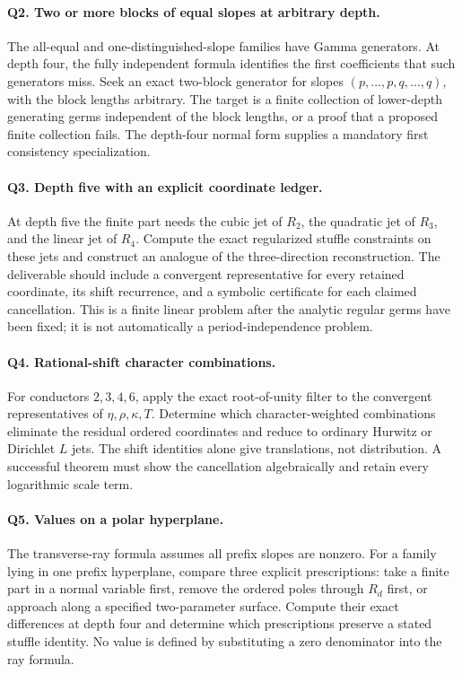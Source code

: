 \documentclass[11pt,a4paper]{article}
\numberwithin{equation}{section}
\theoremstyle{definition}
\theoremstyle{remark}
\begin{document}
\paragraph{Q2. Two or more blocks of equal slopes at arbitrary depth.}
The all-equal and one-distinguished-slope families have Gamma
generators. At depth four, the fully independent formula identifies
the first coefficients that such generators miss. Seek an exact
two-block generator for slopes
$(p,\ldots,p,q,\ldots,q)$, with the block lengths arbitrary. The target
is a finite collection of lower-depth generating germs independent of
the block lengths, or a proof that a proposed finite collection fails.
The depth-four normal form supplies a mandatory first consistency
specialization.

\paragraph{Q3. Depth five with an explicit coordinate ledger.}
At depth five the finite part needs the cubic jet of $R_2$, the
quadratic jet of $R_3$, and the linear jet of $R_4$. Compute the exact
regularized stuffle constraints on these jets and construct an analogue
of the three-direction reconstruction. The deliverable should include
a convergent representative for every retained coordinate, its shift
recurrence, and a symbolic certificate for each claimed cancellation.
This is a finite linear problem after the analytic regular germs have
been fixed; it is not automatically a period-independence problem.

\paragraph{Q4. Rational-shift character combinations.}
For conductors $2,3,4,6$, apply the exact root-of-unity filter to the
convergent representatives of $\eta,\rho,\kappa,T$. Determine which
character-weighted combinations eliminate the residual ordered
coordinates and reduce to ordinary Hurwitz or Dirichlet $L$ jets.
The shift identities alone give translations, not distribution.
A successful theorem must show the cancellation algebraically and
retain every logarithmic scale term.

\paragraph{Q5. Values on a polar hyperplane.}
The transverse-ray formula assumes all prefix slopes are nonzero.
For a family lying in one prefix hyperplane, compare three explicit
prescriptions: take a finite part in a normal variable first, remove
the ordered poles through $R_d$ first, or approach along a specified
two-parameter surface. Compute their exact differences at depth four
and determine which prescriptions preserve a stated stuffle identity.
No value is defined by substituting a zero denominator into the ray
formula.
\end{document}
